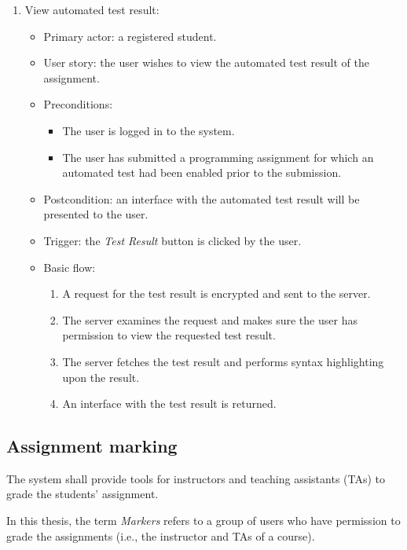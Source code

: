\begin{enumerate}
\item View automated test result:
\begin{itemize}
    \item Primary actor: a registered student.
    \item User story: the user wishes to view the automated test result of the
        assignment.
    \item Preconditions:
        \begin{itemize}
            \item The user is logged in to the system.
            \item The user has submitted a programming assignment for which an
                automated test had been enabled prior to the submission.
        \end{itemize}
    \item Postcondition:
        an interface with the automated test result will be presented to the
        user.
    \item Trigger: the \emph{Test Result} button is clicked by the user.
    \item Basic flow:
        \begin{enumerate}
            \item A request for the test result is encrypted and sent to the
                server.
            \item The server examines the request and makes sure the user has
                permission to view the requested test result.
            \item The server fetches the test result and performs syntax
                highlighting upon the result.
            \item An interface with the test result is returned.
        \end{enumerate}
\end{itemize}
\end{enumerate}

\subsection{Assignment marking}
The system shall provide tools for instructors and teaching assistants (TAs) to
grade the students' assignment.

In this thesis, the term \emph{Markers} refers to a group of users who have
permission to grade the assignments (i.e., the instructor and TAs of a course).

